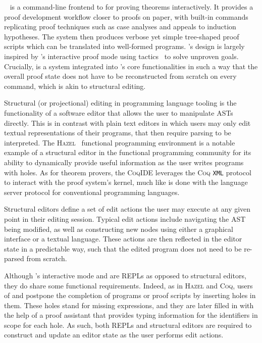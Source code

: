 
\Harpoon~\cite{errington2021harpoon} is a command-line frontend to \Beluga for proving theorems interactively.
It provides a proof development workflow closer to proofs on paper, with built-in commands replicating proof techniques such as case analyses and appeals to induction hypotheses.
The system then produces verbose yet simple tree-shaped proof scripts which can be translated into well-formed \Beluga programs.
\Harpoon's design is largely inspired by \Coq's interactive proof mode using tactics~\cite{delahaye2000tactic} to solve unproven goals.
Crucially, \Harpoon is a system integrated into \Beluga's core functionalities in such a way that the overall proof state does not have to be reconstructed from scratch on every command, which is akin to structural editing.


Structural (or projectional) editing in programming language tooling is the functionality of a software editor that allows the user to manipulate \acp{AST} directly.
This is in contrast with plain text editors in which users may only edit textual representations of their programs, that then require parsing to be interpreted.
The \textsc{Hazel}~\cite{omar2017hazelnut, omar2019live} functional programming environment is a notable example of a structural editor in the functional programming community for its ability to dynamically provide useful information as the user writes programs with holes.
As for theorem provers, the \textsc{CoqIDE} leverages the \textsc{Coq} \texttt{XML} protocol to interact with the proof system's kernel, much like is done with the language server protocol for conventional programming languages.


Structural editors define a set of edit actions the user may execute at any given point in their editing session.
Typical edit actions include navigating the \ac{AST} being modified, as well as constructing new nodes using either a graphical interface or a textual language.
These actions are then reflected in the editor state in a predictable way, such that the edited program does not need to be re-parsed from scratch.


Although \Beluga's interactive mode and \Harpoon are \acp{REPL} as opposed to structural editors, they do share some functional requirements.
Indeed, as in \textsc{Hazel} and \textsc{Coq}, users of \Beluga and \Harpoon postpone the completion of programs or proof scripts by inserting holes in them.
These holes stand for missing expressions, and they are later filled in with the help of a proof assistant that provides typing information for the identifiers in scope for each hole.
As such, both \acp{REPL} and structural editors are required to construct and update an editor state as the user performs edit actions.


